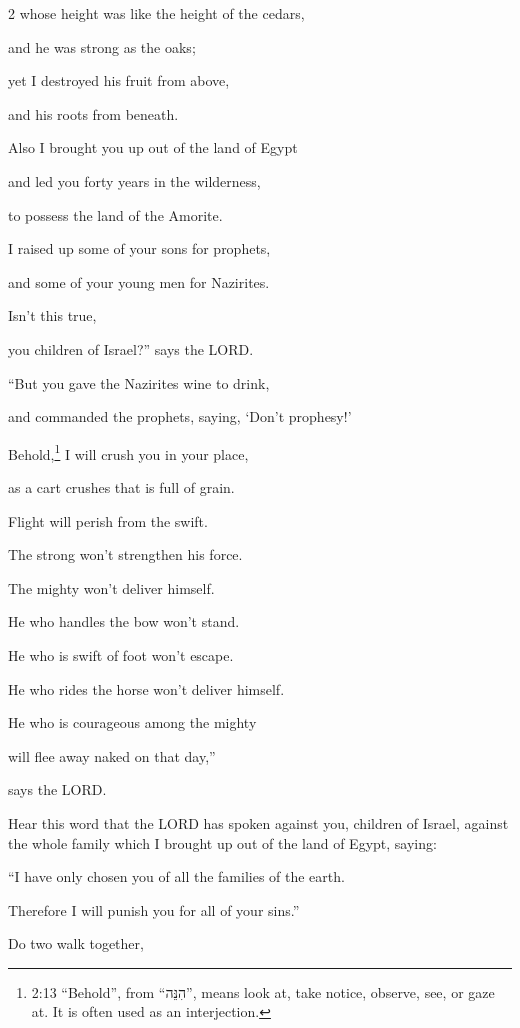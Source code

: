 \begin{multicols}{2}
	whose height was like the height of the cedars,
	
	and he was strong as the oaks;
	
	yet I destroyed his fruit from above,
	
	and his roots from beneath.
	
	\myverse{}Also I brought you up out of the land of Egypt
	
	and led you forty years in the wilderness,
	
	to possess the land of the Amorite.
	
	\myverse{}I raised up some of your sons for prophets,
	
	and some of your young men for Nazirites.
	
	Isn’t this true,
	
	you children of Israel?” says the LORD.
	
	\myverse{}“But you gave the Nazirites wine to drink,
	
	and commanded the prophets, saying, ‘Don’t prophesy!’
	
	\myverse{}Behold,\footnote{2:13 “Behold”, from “הִנֵּה”, means look at, take notice, observe, see, or gaze at. It is
		often used as an interjection.} I will crush you in your place,
	
	as a cart crushes that is full of grain.
	
	\myverse{}Flight will perish from the swift.
	
	The strong won’t strengthen his force.
	
	The mighty won’t deliver himself.
	
	\myverse{}He who handles the bow won’t stand.
	
	He who is swift of foot won’t escape.
	
	He who rides the horse won’t deliver himself.
	
	\myverse{}He who is courageous among the mighty
	
	will flee away naked on that day,”
	
	says the LORD.
	
	
	\mychapter{} \myverse*{}Hear this word that the LORD has spoken against you, children of
	Israel, against the whole family which I brought up out of the land of Egypt, saying:
	
	\myverse{}“I have only chosen you of all the families of the earth.
	
	Therefore I will punish you for all of your sins.”
	
	\myverse{}Do two walk together,
	

\end{multicols}
